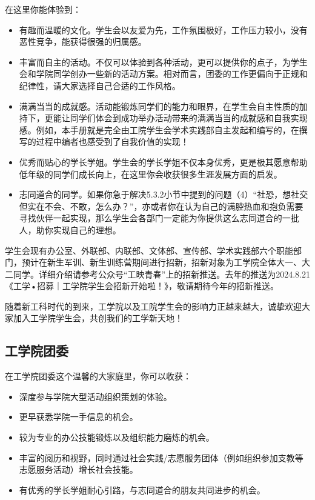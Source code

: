 \documentclass[11pt,oneside]{book}
\begin{document}
在这里你能体验到：
\begin{itemize}
	\item 有趣而温暖的文化。学生会以友爱为先，工作氛围极好，工作压力较小，没有恶性竞争，能获得很强的归属感。
	\item 丰富而自主的活动。不仅可以体验到各种活动，更可以提供你的点子，为学生会和学院同学创办一些新的活动方案。相对而言，团委的工作更偏向于正规和纪律性，请大家选择自己合适的工作风格。
	\item 满满当当的成就感。活动能锻炼同学们的能力和眼界，在学生会自主性质的加持下，更能让同学们体会到成功举办活动带来的满满当当的成就感和自我实现感。例如，本手册就是完全由工院学生会学术实践部自主发起和编写的，在撰写的过程中编者也感受到了自我价值的实现！
	\item 优秀而贴心的学长学姐。学生会的学长学姐不仅本身优秀，更是极其愿意帮助低年级的同学们成长向上，在这里你会收获很多生涯发展方面的启发。
	\item 志同道合的同学。如果你急于解决5.3.2小节中提到的问题（4）“社恐，想社交但实在不会、不敢，怎么办？”，亦或者你在认为自己的满腔热血和抱负需要寻找伙伴一起实现，那么学生会各部门一定能为你提供这么志同道合的一批人，助你实现自己的理想。
\end{itemize}

学生会现有办公室、外联部、内联部、文体部、宣传部、学术实践部六个职能部门，预计在新生军训、新生训练营期间进行招新，招新对象为工学院全体大一、大二同学。详细介绍请参考公众号“工映青春”上的招新推送。去年的推送为2024.8.21《工学•招募｜工学院学生会招新开始啦！》，敬请期待今年的招新推送。

\vspace{10pt}

随着新工科时代的到来，工学院以及工院学生会的影响力正越来越大，诚挚欢迎大家加入工学院学生会，共创我们的工学新天地！

\subsection{工学院团委}

在工学院团委这个温馨的大家庭里，你可以收获：

\begin{itemize}
	\item 深度参与学院大型活动组织策划的体验。
	\item 更早获悉学院一手信息的机会。
	\item 较为专业的办公技能锻炼以及组织能力磨炼的机会。
	\item 丰富的阅历和视野，同时通过社会实践/志愿服务团体（例如组织参加支教等志愿服务活动）增长社会技能。
	\item 有优秀的学长学姐耐心引路，与志同道合的朋友共同进步的机会。
\end{itemize}
\end{document}

